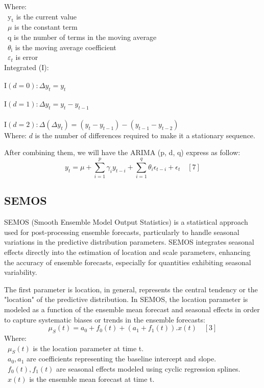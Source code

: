 \documentclass{ieeeojies}
\begin{document}
Where: \\
\indent\textbullet\ \(\mathrm{y}_{\mathrm{t}}\) is the current value \\ 
\indent\textbullet\ \(\mu\) is the constant term \\ 
\indent\textbullet\ \(\mathrm{q}\) is the number of terms in the moving average \\ 
\indent\textbullet\ \(\theta_{\mathrm{i}}\) is the moving average coefficient \\ 
\indent\textbullet\ \(\varepsilon_{t}\) is error \\
Integrated (I):\\
 \\$\mathrm{I}(d=0): \Delta y_t=y_t$\\
 \\$\mathrm{I}(d=1): \Delta y_t=y_t-y_{t-1}$\\
 \\$\mathrm{I}(d=2): \Delta\left(\Delta y_t\right)=\left(y_t-y_{t-1}\right)-\left(y_{t-1}-y_{t-2}\right)$ \\
 Where: \(d\) is the number of differences required to make it a stationary sequence. 

After combining them, we will have the ARIMA (p, d, q) express as follow:
$$
y_t=\mu+\sum_{i=1}^p \gamma_i y_{t-i}+\sum_{i=1}^q \theta_i \epsilon_{t-i}+\epsilon_t \quad [7]
$$
\subsection{SEMOS}
SEMOS (Smooth Ensemble Model Output Statistics) is a statistical approach used for post-processing ensemble forecasts, particularly to handle seasonal variations in the predictive distribution parameters. SEMOS integrates seasonal effects directly into the estimation of location and scale parameters, enhancing the accuracy of ensemble forecasts, especially for quantities exhibiting seasonal variability.

The first parameter is location, in general, represents the central tendency or the "location" of the predictive distribution. In SEMOS, the location parameter is modeled as a function of the ensemble mean forecast and seasonal effects in order to capture systematic biases or trends in the ensemble forecasts:
\[\mu_S(t) = a_0 + f_0(t) + (a_1 + f_1(t)) . x(t) \quad[3]\]
Where: \\
        \indent\textbullet\ \(\mu_S(t)\) is the location parameter at time t. \\
        \indent\textbullet\ \(a_0, a_1\) are coefficients representing the baseline intercept and slope. \\
        \indent\textbullet\ \(f_0(t), f_1(t)\) are seasonal effects modeled using cyclic regression splines. \\
        \indent\textbullet\ \(x(t)\) is the ensemble mean forecast at time t. \\
\end{document}
